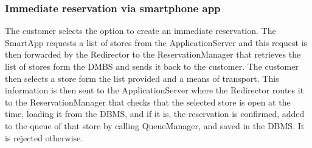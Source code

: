 \subsubsection{Immediate reservation via smartphone app}
\begin{figure}[H]
	\noindent
\end{figure}
The customer selects the option to create an immediate reservation. The SmartApp requests a list of stores from the ApplicationServer and this request is then forwarded by the Redirector to the ReservationManager that retrieves the list of stores form the DMBS and sends it back to the customer. The customer then selects a store form the list provided and a means of transport. This information is then sent to the ApplicationServer where the Redirector routes it to the ReservationManager that checks that the selected store is open at the time, loading it from the DBMS, and if it is, the reservation is confirmed, added to the queue of that store by calling QueueManager, and saved in the DBMS. It is rejected otherwise.
